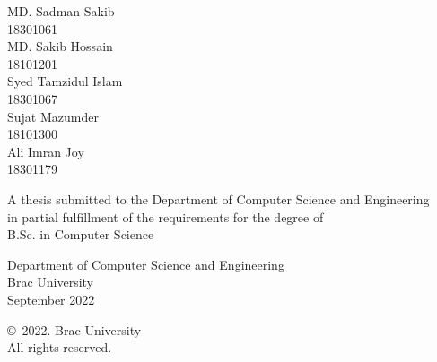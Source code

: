 \begin{titlepage}
\renewcommand*{\thepage}{Title} %

    \begin{center} 
        \vspace*{3cm} %
        
        {\fontsize{17.28pt}{22pt}\selectfont{AUDIO CLASSIFICATION
        }
        } %
        
        \vspace{1.5cm}
        
        
        \vspace{0.5cm}
        
        MD. Sadman Sakib\\
        18301061\\
        MD. Sakib Hossain\\
        18101201\\
        Syed Tamzidul Islam\\
        18301067\\
        Sujat Mazumder\\
        18101300\\
        Ali Imran Joy\\
        18301179


        \vspace{1.5cm}
        
        	A thesis submitted to the Department of Computer Science and Engineering\\
            in partial fulfillment of the requirements for the degree of\\
            B.Sc. in Computer Science

        
        \vspace{2.5cm}
        
    		Department of Computer Science and Engineering\\
            Brac University\\
            September 2022
        
        \vspace{3cm}
        
    		\copyright\ 2022. Brac University\\
            All rights reserved.
    
    \end{center}

\end{titlepage}